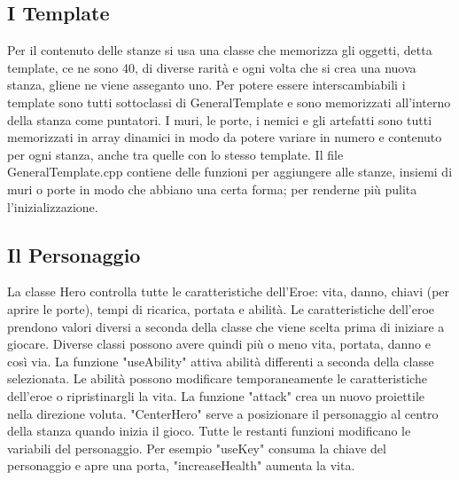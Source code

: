 \documentclass[12pt]{article}
\begin{document}
\subsection{I Template}
Per il contenuto delle stanze si usa una classe che memorizza gli oggetti, detta template, ce ne sono 40,
 di diverse rarità e ogni volta che si crea una nuova stanza, gliene ne viene asseganto uno. \hfill\break
Per potere essere interscambiabili i template sono tutti sottoclassi di GeneralTemplate e sono memorizzati all'interno
 della stanza come puntatori. \hfill\break
I muri, le porte, i nemici e gli artefatti sono tutti memorizzati in array dinamici in modo da potere variare in numero
 e contenuto per ogni stanza, anche tra quelle con lo stesso template.  \hfill\break
Il file GeneralTemplate.cpp contiene delle funzioni per aggiungere alle stanze, insiemi di muri o porte in modo che abbiano
 una certa forma; per renderne più pulita l'inizializzazione.

\subsection{Il Personaggio}
La classe Hero controlla tutte le caratteristiche dell'Eroe: vita, danno, chiavi (per aprire le porte), tempi di ricarica, portata e abilità.
Le caratteristiche dell'eroe prendono valori diversi a seconda della classe che viene scelta prima di iniziare a giocare. Diverse
 classi possono avere quindi più o meno vita, portata, danno e così via.
La funzione "useAbility" attiva abilità differenti a seconda della classe selezionata.
Le abilità possono modificare temporaneamente le caratteristiche dell'eroe o ripristinargli la vita.
La funzione "attack" crea un nuovo proiettile nella direzione voluta. "CenterHero" serve a posizionare il personaggio al centro
 della stanza quando inizia il gioco. 
Tutte le restanti funzioni modificano le variabili del personaggio. Per esempio "useKey" consuma la chiave del personaggio e apre
 una porta, "increaseHealth" aumenta la vita.
\end{document}
